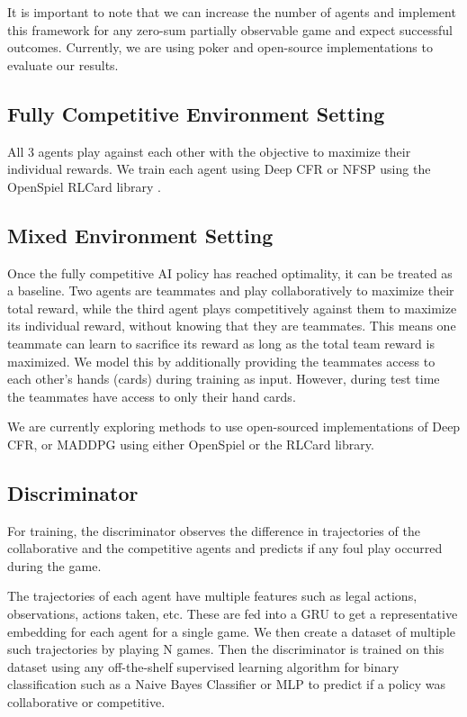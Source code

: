 \documentclass{article}
\begin{document}
It is important to note that we can increase the number of agents and implement this framework for any zero-sum partially observable game and expect successful outcomes. Currently, we are using poker and open-source implementations to evaluate our results.

\subsection{Fully Competitive Environment Setting}

All 3 agents play against each other with the objective to maximize their individual rewards. We train each agent using Deep CFR \cite{dcfr:2018} or NFSP \cite{nsfp:2016} using the OpenSpiel \cite{openspiel:2019} RLCard library \cite{rlcard}. 

\subsection{Mixed Environment Setting}

Once the fully competitive AI policy has reached optimality, it can be treated as a baseline. Two agents are teammates and play collaboratively to maximize their total reward, while the third agent plays competitively against them to maximize its individual reward, without knowing that they are teammates. This means one teammate can learn to sacrifice its reward as long as the total team reward is maximized. We model this by additionally providing the teammates access to each other's hands (cards) during training as input. However, during test time the teammates have access to only their hand cards. 

We are currently exploring methods to use open-sourced implementations of Deep CFR, or MADDPG \cite{maddpg} using either OpenSpiel or the RLCard library. 

\subsection{Discriminator}

For training, the discriminator observes the difference in trajectories of the collaborative and the competitive agents and predicts if any foul play occurred during the game.

The trajectories of each agent have multiple features such as legal actions, observations, actions taken, etc. These are fed into a GRU to get a representative embedding for each agent for a single game. We then create a dataset of multiple such trajectories by playing N games. Then the discriminator is trained on this dataset using any off-the-shelf supervised learning algorithm for binary classification such as a Naive Bayes Classifier or MLP to predict if a policy was collaborative or competitive.
\end{document}
